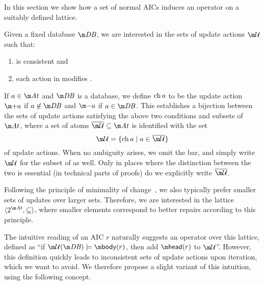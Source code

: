 In this section we show how a set of normal AICs induces an operator on a suitably defined lattice.


Given a fixed database $\db$, we are interested in the sets of update actions $\UU$ such that:
\begin{enumerate}
\item \UU is consistent and 
\item each action in \UU modifies \db.
\end{enumerate}
If $a\in \atoms$ and $\db$ is a database, we define $\operatorname{ch} a$ to be the update action $\add a$ if $a\not\in \db$ and $\remove a$ if $a \in \db$.
This establishes a bijection between the sets of update actions satisfying the above two conditions and subsets of $\atoms$, where a set of atoms $\overline\UU\subseteq\atoms$ is identified with the set 
\[\UU = \{\change a\mid a \in \overline \UU \}\]
of update actions.
When no ambiguity arises, we omit the bar, and simply write $\UU$ for the subset of \atoms as well.
Only in places where the distinction between the two is essential (in technical parts of proofs) do we explicitly write $\overline\UU$.

Following the principle of minimality of change~\cite{Winslett90,ai/EiterG92}, we also typically prefer smaller sets of updates over larger sets.
Therefore, we are interested in the lattice $\langle 2^{\atoms},\subseteq\rangle$, where smaller elements correspond to better repairs according to this principle.

The intuitive reading of an AIC $r$ naturally suggests an operator over this lattice, defined as ``if $\UU(\db)\models\body(r)$, then add $\head(r)$ to $\UU$''.
However, this definition quickly leads to inconsistent sets of update actions upon iteration, which we want to avoid.
We therefore propose a slight variant of this intuition, using the following concept.

